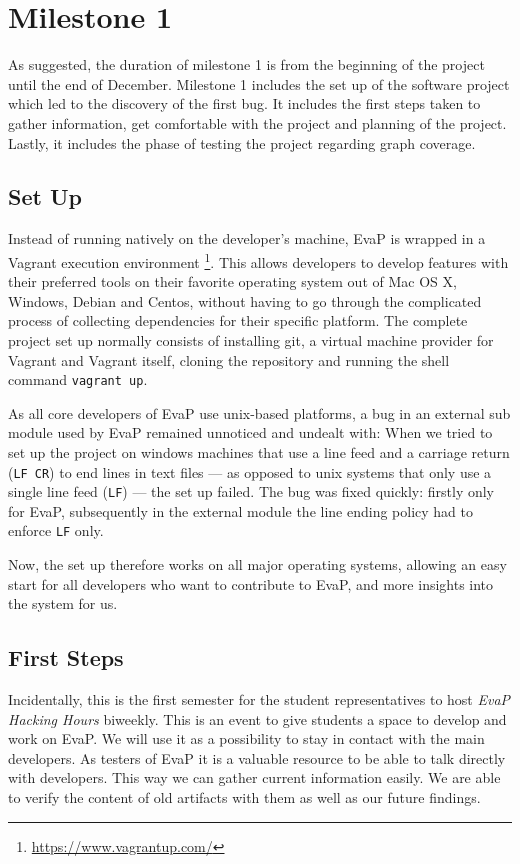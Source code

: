 \section{Milestone 1}
As suggested, the duration of milestone 1 is from the beginning of the project until the end of December.
Milestone 1 includes the set up of the software project which led to the discovery of the first bug.
It includes the first steps taken to gather information, get comfortable with the project and planning of the project.
Lastly, it includes the phase of testing the project regarding graph coverage.

\subsection{Set Up}\label{setup}
Instead of running natively on the developer's machine, EvaP is wrapped in a Vagrant execution environment%
\footnote{\url{https://www.vagrantup.com/}}.
This allows developers to develop features with their preferred tools on their favorite operating system out of Mac OS X, Windows, Debian and Centos, without having to go through the complicated process of collecting dependencies for their specific platform.
The complete project set up normally consists of installing git, a virtual machine provider for Vagrant and Vagrant itself, cloning the repository and running the shell command \texttt{vagrant up}.

As all core developers of EvaP use unix-based platforms, a bug in an external sub module used by EvaP remained unnoticed and undealt with:
When we tried to set up the project on windows machines that use a line feed and a carriage return (\texttt{LF}~\texttt{CR}) to end lines in text files --- as opposed to unix systems that only use a single line feed (\texttt{LF}) --- the set up failed.
The bug was fixed quickly: firstly only for EvaP, subsequently in the external module the line ending policy had to enforce \texttt{LF} only.

Now, the set up therefore works on all major operating systems, allowing an easy start for all developers who want to contribute to EvaP, and more insights into the system for us.

\subsection{First Steps}
Incidentally, this is the first semester for the student representatives to host \emph{EvaP Hacking Hours} biweekly.
This is an event to give students a space to develop and work on EvaP.
We will use it as a possibility to stay in contact with the main developers.
As testers of EvaP it is a valuable resource to be able to talk directly with developers.
This way we can gather current information easily.
We are able to verify the content of old artifacts with them as well as our future findings.

